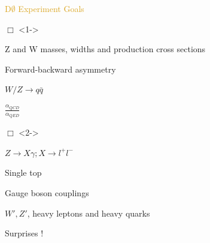\begin{frame}{\textcolor{Goldenrod}{D$\emptyset$ Experiment Goals}}
  \itt
\item[$\Box$]<1-> 
\itt
\item Z and W masses, widths and production cross sections
\item Forward-backward asymmetry
\item $W/Z \to q\bar{q}$
\item $\frac{\alpha_{QCD}}{\alpha_{QED}}$ 
  \tti

\item[$\Box$]<2-> \\
  \itt
\item $Z \to X \gamma; X\to l^+l^-$
\item Single top
\item Gauge boson couplings
\item {}
\item {}
\item $W', Z'$, heavy leptons and heavy quarks
\item Surprises !
  \tti
  \tti
\end{frame}  

  
